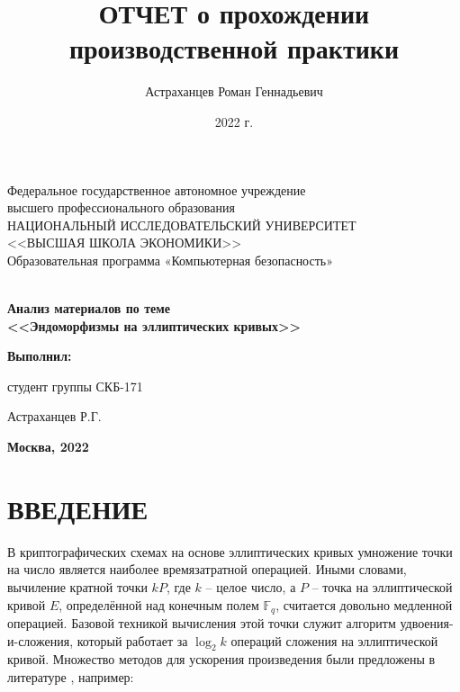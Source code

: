 \documentclass[a4paper,12pt]{article}
\author{Астраханцев Роман Геннадьевич}
\title{ОТЧЕТ о прохождении производственной практики}
\date{2022 г.}
\theoremstyle{definition}
\begin{document}
	
	\thispagestyle{empty}
	\begin{center}
		Федеральное государственное автономное учреждение \\ высшего профессионального образования \\

		НАЦИОНАЛЬНЫЙ ИССЛЕДОВАТЕЛЬСКИЙ УНИВЕРСИТЕТ \\ <<ВЫСШАЯ ШКОЛА ЭКОНОМИКИ>> \\
		\vspace{2ex}
		Образовательная программа «Компьютерная безопасность» \\
	\end{center}

	\begin{center}
		\vspace{15ex}
		\textbf{ \\ \vspace{3ex} Анализ материалов по теме \\ <<Эндоморфизмы на эллиптических кривых>>}
	\end{center}

	\vspace{17ex}

	\hspace{0.6\linewidth} 	\textbf{Выполнил:} 
	
	\hspace{0.6\linewidth}  студент группы СКБ-171 
	
	\hspace{0.6\linewidth}  Астраханцев Р.Г. 


	
	\begin{center}
		
		\vfill
		\textbf{Москва, 2022}
	\end{center}
	
	\newpage
	\tableofcontents
	
	\newpage
	\section*{ВВЕДЕНИЕ}
	
	В криптографических схемах на основе эллиптических кривых умножение точки на число является наиболее времязатратной операцией. Иными словами, вычиление кратной точки $k P$, где $k$ -- целое число, а $P$ -- точка на эллиптической кривой $E$, определённой над конечным полем $\mathbb{F}_q$, считается довольно медленной операцией. Базовой техникой вычисления этой точки служит алгоритм удвоения-и-сложения, который работает за $\log_2 k$ операций сложения на эллиптической кривой. Множество методов для ускорения произведения были предложены в литературе \cite{gordon1998survey, hankerson2000software, menezes2018handbook}, например:
	
\end{document}
